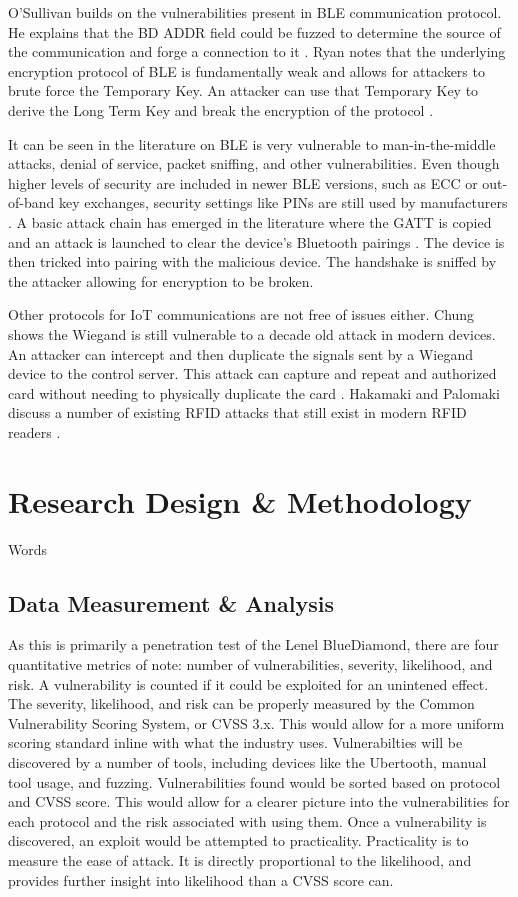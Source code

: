 \documentclass[10pt,twocolumn,letterpaper]{article}
\begin{document}
O'Sullivan builds on the vulnerabilities present in BLE communication protocol. He explains that the BD ADDR field could be fuzzed to determine the source of the communication and forge a connection to it \cite{osullivan}. Ryan notes that the underlying encryption protocol of BLE is fundamentally weak and allows for attackers to brute force the Temporary Key. An attacker can use that Temporary Key to derive the Long Term Key and break the encryption of the protocol \cite{mryan13}.

It can be seen in the literature on BLE is very vulnerable to man-in-the-middle attacks, denial of service, packet sniffing, and other vulnerabilities. Even though higher levels of security are included in newer BLE versions, such as ECC or out-of-band key exchanges, security settings like PINs are still used by manufacturers \cite{8622000}\cite{jaihc19}\cite{mryan13}. A basic attack chain has emerged in the literature where the GATT is copied and an attack is launched to clear the device's Bluetooth pairings \cite{jaihc19}. The device is then tricked into pairing with the malicious device. The handshake is sniffed by the attacker allowing for encryption to be broken. 

Other protocols for IoT communications are not free of issues either. Chung shows the Wiegand is still vulnerable to a decade old attack in modern devices. An attacker can intercept and then duplicate the signals sent by a Wiegand device to the control server. This attack can capture and repeat and authorized card without needing to physically duplicate the card \cite{chung2017wiegand}. Hakamaki and Palomaki discuss a number of existing RFID attacks that still exist in modern RFID readers \cite{rfid15}.

\section{Research Design \& Methodology}
Words

\subsection{Data Measurement \& Analysis}
As this is primarily a penetration test of the Lenel BlueDiamond, there are four quantitative metrics of note: number of vulnerabilities, severity, likelihood, and risk. A vulnerability is counted if it could be exploited for an unintened effect. The severity, likelihood, and risk can be properly measured by the Common Vulnerability Scoring System, or CVSS 3.x. This would allow for a more uniform scoring standard inline with what the industry uses. Vulnerabilties will be discovered by a number of tools, including devices like the Ubertooth, manual tool usage, and fuzzing. Vulnerabilities found would be sorted based on protocol and CVSS score. This would allow for a clearer picture into the vulnerabilities for each protocol and the risk associated with using them. Once a vulnerability is discovered, an exploit would be attempted to practicality. Practicality is to measure the ease of attack. It is directly proportional to the likelihood, and provides further insight into likelihood than a CVSS score can. 
\end{document}
